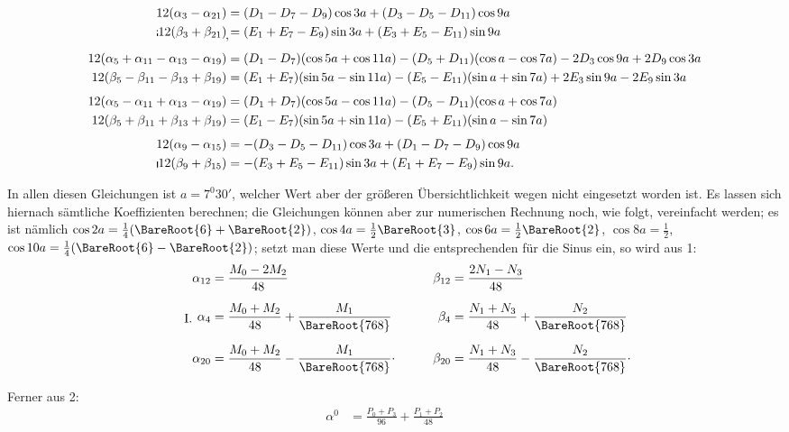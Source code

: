 \begin{landscape}
\[\begin{aligned}
12(\alpha_3-\alpha_{21})&=(D_1-D_7-D_9)\cos3a+(D_3-D_5-D_{11})\cos9a\\
\VthreeBrokenMark12(\beta_3+\beta_{21})\VthreeLowMark&=(E_1+E_7-E_9)\sin3a+(E_3+E_5-E_{11})\sin9a\\[4pt]
12(\alpha_5+\alpha_{11}-\alpha_{13}-\alpha_{19})&=(D_1-D_7)(\cos5a+\cos11a)-(D_5+D_{11})(\cos a-\cos7a)-2D_3\cos9a+2D_9\cos3a\\
12(\beta_5-\beta_{11}-\beta_{13}+\beta_{19})&=(E_1+E_7)(\sin5a-\sin11a)-(E_5-E_{11})(\sin a+\sin7a)+2E_3\sin9a-2E_9\sin3a\\[4pt]
12(\alpha_5-\alpha_{11}+\alpha_{13}-\alpha_{19})&=(D_1+D_7)(\cos5a-\cos11a)-(D_5-D_{11})(\cos a+\cos7a)\\
12(\beta_5+\beta_{11}+\beta_{13}+\beta_{19})&=(E_1-E_7)(\sin5a+\sin11a)-(E_5+E_{11})(\sin a-\sin7a)\\[4pt]
12(\alpha_9-\alpha_{15})&=-(D_3-D_5-D_{11})\cos3a+(D_1-D_7-D_9)\cos9a\\
\VthreeVerticalMark12(\beta_9+\beta_{15})&=-(E_3+E_5-E_{11})\sin3a+(E_1+E_7-E_9)\sin9a.
\end{aligned}
\]
\par\noindent\hspace*{\parindent}In allen diesen Gleichungen ist \(a=7^0 30'\), welcher Wert aber der größeren Übersichtlichkeit wegen nicht eingesetzt worden ist. Es lassen sich hiernach sämtliche Koeffizienten berechnen; die Gleichungen können aber zur numerischen Rechnung noch, wie folgt, vereinfacht werden; es ist nämlich \(\cos2a=\tfrac14(\BareRoot{6}+\BareRoot{2})\), \(\cos4a=\tfrac12\BareRoot{3}\), \(\cos6a=\tfrac12\BareRoot{2}\), \(\cos8a=\tfrac12\), \(\cos10a=\tfrac14(\BareRoot{6}-\BareRoot{2})\); setzt man diese Werte und die entsprechenden für die Sinus ein, so wird aus 1:
\[
\tag*{I.}
\begin{aligned}
\alpha_{12}&=\frac{M_0-2M_2}{48}&\qquad\beta_{12}&=\frac{2N_1-N_3}{48}\\[6pt]
\alpha_4&=\frac{M_0+M_2}{48}+\frac{M_1}{\BareRoot{768}}&\beta_4&=\frac{N_1+N_3}{48}+\frac{N_2}{\BareRoot{768}}\\[6pt]
\alpha_{20}&=\frac{M_0+M_2}{48}-\frac{M_1}{\BareRoot{768}}\VthreeRaisedPoint&\beta_{20}&=\frac{N_1+N_3}{48}-\frac{N_2}{\BareRoot{768}}\VthreeRaisedPoint
\end{aligned}
\]
\clearpage{}
\par\noindent\hspace*{\parindent}Ferner aus 2:
\[
\tag*{II.}
\begin{aligned}
\alpha^0&=\frac{P_0+P_3}{96}+\frac{P_1+P_2}{48}&&\\[6pt]

\end{aligned}\]
\end{landscape}
